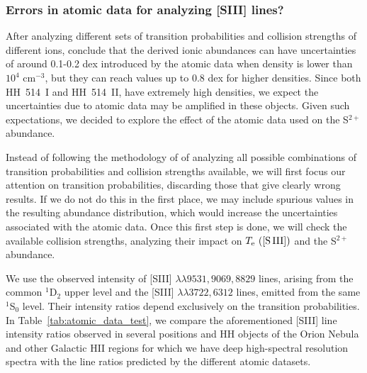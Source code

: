 \documentclass[fleqn,usenatbib]{mnras}
\begin{document}
\subsubsection{Errors in    atomic data for analyzing [S\thinspace III] lines?}
\label{subsec:atomic_data}

After analyzing different sets of transition probabilities and collision strengths of different ions, \citet{Juan-de-Dios17} conclude that the derived ionic abundances can have uncertainties of around 0.1-0.2 dex introduced by the atomic data when density is lower than $10^4$ cm$^{-3}$, but they can reach values up to 0.8 dex for higher densities. Since both HH~514~I and HH~514~II, have extremely high densities, we expect the uncertainties due to atomic data may be amplified in these objects. Given such expectations, we decided to explore the effect of the atomic data used on the S$^{2+}$ abundance.

Instead of following the methodology of  \citet{Juan-de-Dios17} of analyzing all possible combinations of transition probabilities and collision strengths available, we will first focus our attention on transition probabilities, discarding those that give clearly wrong results. If we do not do this in the first place, we may include spurious values in the resulting abundance distribution, which would increase the uncertainties associated with the atomic data. Once this first step is done, we will check the available collision strengths, analyzing their impact on $T_{\rm e} \text{ ([S\thinspace III])}$ and the S$^{2+}$ abundance.


We use the observed intensity of [S\thinspace III] $\lambda \lambda 9531, 9069, 8829$ lines, arising from the common $^1$D$_2$ upper level and the [S\thinspace III] $\lambda \lambda 3722, 6312$ lines, emitted from the same $^1$S$_0$ level. Their intensity ratios depend exclusively on the transition probabilities. In Table~\ref{tab:atomic_data_test}, we compare the aforementioned [S\thinspace III] line intensity ratios observed in several positions and HH objects of the Orion Nebula and other Galactic H\thinspace II regions for which we have deep high-spectral resolution spectra with the line ratios predicted by the different atomic datasets.    
\end{document}
